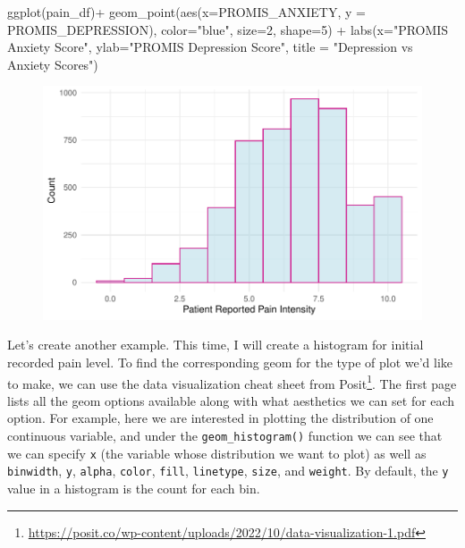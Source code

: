 \documentclass[
  letterpaper,
]{krantz}
\makeatletter
\newenvironment{Shaded}{\begin{snugshade}}{\end{snugshade}}
\newcommand{\AttributeTok}[1]{\textcolor[rgb]{0.40,0.45,0.13}{#1}}
\newcommand{\DecValTok}[1]{\textcolor[rgb]{0.68,0.00,0.00}{#1}}
\newcommand{\FunctionTok}[1]{\textcolor[rgb]{0.28,0.35,0.67}{#1}}
\newcommand{\NormalTok}[1]{\textcolor[rgb]{0.00,0.23,0.31}{#1}}
\newcommand{\SpecialCharTok}[1]{\textcolor[rgb]{0.37,0.37,0.37}{#1}}
\newcommand{\StringTok}[1]{\textcolor[rgb]{0.13,0.47,0.30}{#1}}
\renewcommand{\href}[2]{#2\footnote{\url{#1}}}
\newenvironment{kframe}{%
\medskip{}
\setlength{\fboxsep}{.8em}
 \def\at@end@of@kframe{}%
 \ifinner\ifhmode%
  \def\at@end@of@kframe{\end{minipage}}%
  \begin{minipage}{\columnwidth}%
 \fi\fi%
 \def\FrameCommand##1{\hskip\@totalleftmargin \hskip-\fboxsep
 \colorbox{shadecolor}{##1}\hskip-\fboxsep
     \hskip-\linewidth \hskip-\@totalleftmargin \hskip\columnwidth}%
 \MakeFramed {\advance\hsize-\width
   \@totalleftmargin\z@ \linewidth\hsize
   \@setminipage}}%
 {\par\unskip\endMakeFramed%
 \at@end@of@kframe}
\renewenvironment{Shaded}{\begin{kframe}}{\end{kframe}}
\makeatother
\begin{document}
\begin{Shaded}
\begin{Highlighting}[]
\FunctionTok{ggplot}\NormalTok{(pain\_df)}\SpecialCharTok{+}
  \FunctionTok{geom\_point}\NormalTok{(}\FunctionTok{aes}\NormalTok{(}\AttributeTok{x=}\NormalTok{PROMIS\_ANXIETY, }\AttributeTok{y =}\NormalTok{ PROMIS\_DEPRESSION), }
             \AttributeTok{color=}\StringTok{"blue"}\NormalTok{, }\AttributeTok{size=}\DecValTok{2}\NormalTok{, }\AttributeTok{shape=}\DecValTok{5}\NormalTok{) }\SpecialCharTok{+} 
  \FunctionTok{labs}\NormalTok{(}\AttributeTok{x=}\StringTok{"PROMIS Anxiety Score"}\NormalTok{, }\AttributeTok{ylab=}\StringTok{"PROMIS Depression Score"}\NormalTok{, }
       \AttributeTok{title =} \StringTok{"Depression vs Anxiety Scores"}\NormalTok{)}
\end{Highlighting}
\end{Shaded}

\begin{figure}[H]

{\centering \includegraphics[width=1\textwidth,height=\textheight]{book/7_visualization_ggplot_files/figure-pdf/unnamed-chunk-5-1.pdf}

}

\end{figure}

Let's create another example. This time, I will create a histogram for
initial recorded pain level. To find the corresponding geom for the type
of plot we'd like to make, we can use the
\href{https://posit.co/wp-content/uploads/2022/10/data-visualization-1.pdf}{data
visualization cheat sheet from Posit}. The first page lists all the geom
options available along with what aesthetics we can set for each option.
For example, here we are interested in plotting the distribution of one
continuous variable, and under the \texttt{geom\_histogram()} function
we can see that we can specify \texttt{x} (the variable whose
distribution we want to plot) as well as \texttt{binwidth}, \texttt{y},
\texttt{alpha}, \texttt{color}, \texttt{fill}, \texttt{linetype},
\texttt{size}, and \texttt{weight}. By default, the \texttt{y} value in
a histogram is the count for each bin.
\end{document}
